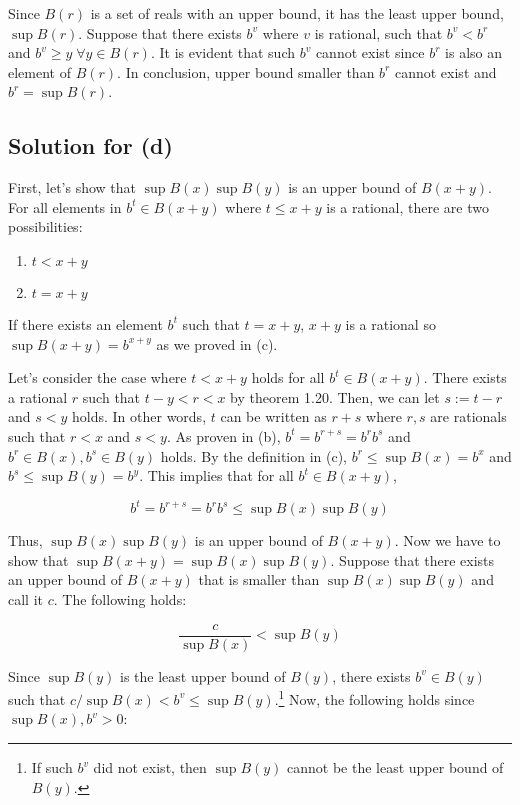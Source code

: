 \documentclass{scrartcl}
\begin{document}
Since \(B(r)\) is a set of reals with an upper bound, it has the least upper bound, \(\sup B(r)\).
Suppose that there exists \(b^v\) where \(v\) is rational, such that \(b^v < b^r\) and \(b^v \geq y \; \forall y \in B(r)\).
It is evident that such \(b^v\) cannot exist since \(b^r\) is also an element of \(B(r)\).
In conclusion, upper bound smaller than \(b^r\) cannot exist and \(b^r = \sup B(r)\).

\subsection{Solution for (d)}
First, let's show that \(\sup B(x)\sup B(y)\) is an upper bound of \(B(x + y)\).
For all elements in \(b^t \in B(x + y)\) where \(t \leq x + y\) is a rational, there are two possibilities:

\begin{enumerate}
  \item \(t < x + y\)
  \item \(t = x + y\)
\end{enumerate}

If there exists an element \(b^t\) such that \(t = x + y\), \(x + y\) is a rational so \(\sup B(x + y) = b^{x + y}\) as we proved in (c).

Let's consider the case where \(t < x + y\) holds for all \(b^t \in B(x + y)\).
There exists a rational \(r\) such that \(t - y < r < x\) by theorem 1.20.
Then, we can let \(s := t - r\) and \(s < y\) holds.
In other words, \(t\) can be written as \(r + s\) where \(r, s\) are rationals such that \(r < x\) and \(s < y\).
As proven in (b), \(b^t = b^{r + s} = b^r b^s\) and \(b^r \in B(x), b^s \in B(y)\) holds.
By the definition in (c), \(b^r \leq \sup B(x) = b^x\) and \(b^s \leq \sup B(y) = b^y\).
This implies that for all \(b^t \in B(x + y)\),

\[
  b^t = b^{r + s} = b^r b^s \leq \sup B(x) \sup B(y)
\]

Thus, \(\sup B(x) \sup B(y)\) is an upper bound of \(B(x + y)\).
Now we have to show that \(\sup B(x + y) = \sup B(x) \sup B(y)\).
Suppose that there exists an upper bound of \(B(x + y)\) that is smaller than \(\sup B(x) \sup B(y)\) and call it \(c\).
The following holds:

\[
  \frac{c}{\sup B(x)} < \sup B(y)
\]

Since \(\sup B(y)\) is the least upper bound of \(B(y)\), there exists \(b^v \in B(y)\) such that \(c / \sup B(x) < b^v \leq \sup B(y)\).\footnote{If such \(b^v\) did not exist, then \(\sup B(y)\) cannot be the least upper bound of \(B(y)\).}
Now, the following holds since \(\sup B(x), b^v > 0\):
\end{document}
